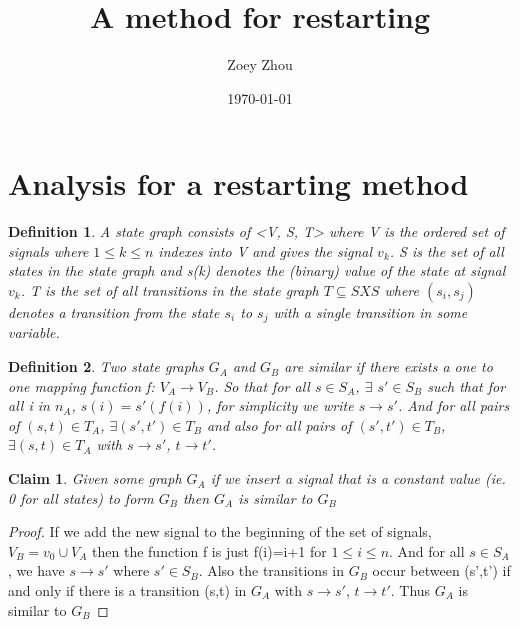 \documentclass{article}
\title{A method for restarting}
\author{Zoey Zhou}
\date{\today}
\newtheorem*{definition}{Definition}
\newtheorem*{claim}{Claim}
\begin{document}
\section{Analysis for a restarting method}

\begin{definition}A state graph consists of <V, S, T> where V is the ordered set of signals where $1\leq k \leq n$ indexes into V and gives the signal $v_k$.  S is the set of all states in the state graph
and s(k) denotes the (binary) value of the state at signal $v_k$.  T is the set of all transitions in the state graph $T \subseteq S X S$ where $(s_i, s_j)$ denotes a transition from the state $s_i$ to $s_j$ 
with a single transition in some variable.\end{definition}
\begin{definition}Two state graphs $G_A$ and $G_B$ are similar if there exists a one to one mapping function f: $V_A \to V_B$.  So that for all $s \in S_A$, $\exists$ $s' \in S_B$ such that for all i in $n_A$,
$s(i)=s'(f(i))$, for simplicity we write $s\to s'$. And for all pairs of $(s,t) \in T_A$, $\exists (s',t') \in T_B$ and also for all pairs of $(s',t') \in T_B$, $\exists (s,t) \in T_A$ with $s\to s'$, $t\to t'$.\end{definition}

\begin{claim}Given some graph $G_A$ if we insert a signal that is a constant value (ie. 0 for all states) to form $G_B$ then $G_A$ is similar to $G_B$  \end{claim}
\begin{proof}
If we add the new signal to the beginning of the set of signals, $V_B={v_0} \cup V_A$ then the function f is just f(i)=i+1 for $1\leq i \leq n$.  And for all $s \in S_A$, we have $s\to s'$ where $s' \in S_B$.
Also the transitions in $G_B$ occur between (s',t') if and only if there is a transition (s,t) in $G_A$ with $s\to s'$, $t\to t'$.  Thus $G_A$ is similar to $G_B$
\end{proof}
\end{document}
